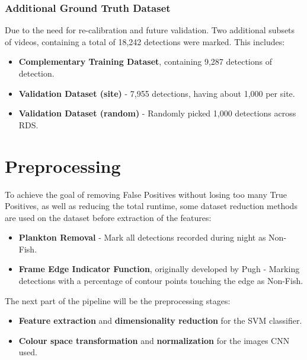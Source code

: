 \documentclass[bsc,logo,twoside,fullspacing,parskip]{infthesis}
\begin{document}
\vspace{-10pt}

\subsection{Additional Ground Truth Dataset}
\label{sec:additionalgt}

Due to the need for re-calibration and future validation. 
Two additional subsets of videos, containing a total of 18,242 detections were marked.
This includes:

\begin{itemize}
\setlength{\parskip}{1pt}
\item
\textbf{Complementary Training Dataset}, containing 9,287 detections of detection. 
\item
\textbf{Validation Dataset (site)} - 7,955 detections, having about 1,000 per site.
\item
\textbf{Validation Dataset (random)} - Randomly picked 1,000 detections across RDS.
\end{itemize}

\chapter{Preprocessing}
\label{chap:prepro}

To achieve the goal of removing False Positives without losing too many True Positives, as well as reducing the total runtime, some dataset reduction methods are used on the dataset before extraction of the features: 

\begin{itemize}
\setlength{\parskip}{1pt}
\item \textbf{Plankton Removal} - Mark all detections recorded during night as Non-Fish.
\item \textbf{Frame Edge Indicator Function}, originally developed by Pugh\cite{Pugh} - Marking detections with a percentage of contour points touching the edge as Non-Fish. 
\end{itemize}

The next part of the pipeline will be the preprocessing stages:

\begin{itemize}
\setlength{\parskip}{1pt}
\item \textbf{Feature extraction} and \textbf{dimensionality reduction} for the SVM classifier.
\item \textbf{Colour space transformation} and \textbf{normalization} for the images CNN used. 
\end{itemize}
\end{document}
